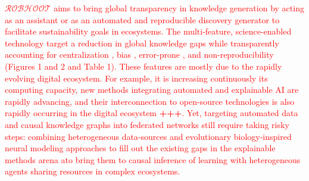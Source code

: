 \documentclass[11pt, a4paper]{article} %
\begin{document}
\textcolor{red}{$\mathcal{ROBHOOT}$ aims to bring global transparency
  in knowledge generation by acting as an assistant or as an automated
  and reproducible discovery generator to facilitate sustainability
  goals in ecosystems. The multi-feature, science-enabled technology
  target a reduction in global knowledge gaps while transparently
  accounting for centralization \citep{Inhaber1977,Gunther2018}⁠⁠, bias⁠⁠
  \citep{Ioannidis2005}, error-prone \citep{Fang2011}, and
  non-reproducibility \citep{Hardwicke2018} (Figures 1 and 2 and Table
  1). These features are mostly due to the rapidly evolving digital
  ecosystem. For example, it is increasing continuously its computing
  capacity, new methods integrating automated and explainable AI are
  rapidly advancing, and their interconnection to open-source
  technologies is also rapidly occurring in the digital ecosystem {\bf
    +++}. Yet, targeting automated data and causal knowledge graphs
  into federated networks still require taking risky steps: combining
  heterogeneous data-sources and evolutionary biology-inspired neural
  modeling approaches to fill out the existing gaps in the explainable
  methods arena ato bring them to causal inference of learning with
  heterogeneous agents sharing resources in complex ecosystems.}

\end{document}

